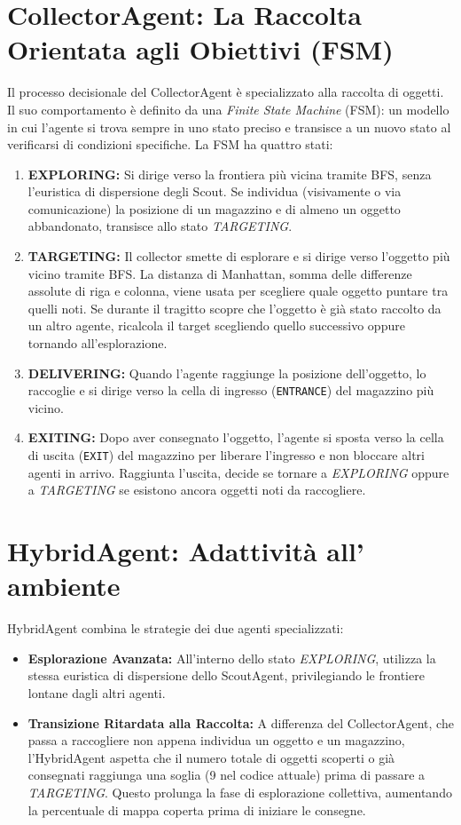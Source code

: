 \documentclass[12pt,a4paper]{report}
\begin{document}
\section{CollectorAgent: La Raccolta Orientata agli Obiettivi (FSM)}
Il processo decisionale del CollectorAgent è specializzato alla raccolta di oggetti. Il suo comportamento è definito da una \textit{Finite State Machine} (FSM): un modello in cui l'agente si trova sempre in uno stato preciso e transisce a un nuovo stato al verificarsi di condizioni specifiche. La FSM ha quattro stati:
\begin{enumerate}
    \item \textbf{EXPLORING:} Si dirige verso la frontiera più vicina tramite BFS, senza l'euristica di dispersione degli Scout. Se individua (visivamente o via comunicazione) la posizione di un magazzino e di almeno un oggetto abbandonato, transisce allo stato \textit{TARGETING}.
    \item \textbf{TARGETING:} Il collector smette di esplorare e si dirige verso l'oggetto più vicino tramite BFS. La distanza di Manhattan, somma delle differenze assolute di riga e colonna, viene usata per scegliere quale oggetto puntare tra quelli noti. Se durante il tragitto scopre che l'oggetto è già stato raccolto da un altro agente, ricalcola il target scegliendo quello successivo oppure tornando all'esplorazione.
    \item \textbf{DELIVERING:} Quando l'agente raggiunge la posizione dell'oggetto, lo raccoglie e si dirige verso la cella di ingresso (\texttt{ENTRANCE}) del magazzino più vicino.
    \item \textbf{EXITING:} Dopo aver consegnato l'oggetto, l'agente si sposta verso la cella di uscita (\texttt{EXIT}) del magazzino per liberare l'ingresso e non bloccare altri agenti in arrivo. Raggiunta l'uscita, decide se tornare a \textit{EXPLORING} oppure a \textit{TARGETING} se esistono ancora oggetti noti da raccogliere.
\end{enumerate}

\newpage

\section{HybridAgent: Adattività all' ambiente}
HybridAgent combina le strategie dei due agenti specializzati:
\begin{itemize}
    \item \textbf{Esplorazione Avanzata:} All'interno dello stato \textit{EXPLORING}, utilizza la stessa euristica di dispersione dello ScoutAgent, privilegiando le frontiere lontane dagli altri agenti.
    \item \textbf{Transizione Ritardata alla Raccolta:} A differenza del CollectorAgent, che passa a raccogliere non appena individua un oggetto e un magazzino, l'HybridAgent aspetta che il numero totale di oggetti scoperti o già consegnati raggiunga una soglia (9 nel codice attuale) prima di passare a \textit{TARGETING}. Questo prolunga la fase di esplorazione collettiva, aumentando la percentuale di mappa coperta prima di iniziare le consegne.
\end{itemize}
\end{document}
